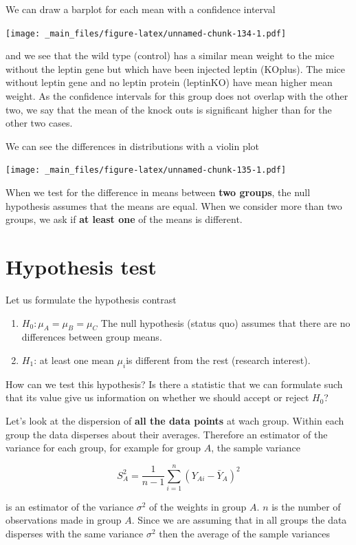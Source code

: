 \documentclass[
]{book}
\begin{document}
We can draw a barplot for each mean with a confidence interval

\texttt{[image: \_main\_files/figure-latex/unnamed-chunk-134-1.pdf]}

and we see that the wild type (control) has a similar mean weight to the mice without the leptin gene but which have been injected leptin (KOplus). The mice without leptin gene and no leptin protein (leptinKO) have mean higher mean weight. As the confidence intervals for this group does not overlap with the other two, we say that the mean of the knock outs is significant higher than for the other two cases.

We can see the differences in distributions with a violin plot

\texttt{[image: \_main\_files/figure-latex/unnamed-chunk-135-1.pdf]}

When we test for the difference in means between \textbf{two groups}, the null hypothesis assumes that the means are equal. When we consider more than two groups, we ask if \textbf{at least one} of the means is different.

\hypertarget{hypothesis-test-2}{%
\section{Hypothesis test}\label{hypothesis-test-2}}

Let us formulate the hypothesis contrast

\begin{enumerate}
\def\labelenumi{\alph{enumi}.}
\item
  \(H_0: \mu_A=\mu_B=\mu_C\) The null hypothesis (status quo) assumes that there are no differences between group means.
\item
  \(H_1\): at least one mean \(\mu_i\)is different from the rest (research interest).
\end{enumerate}

How can we test this hypothesis? Is there a statistic that we can formulate such that its value give us information on whether we should accept or reject \(H_0\)?

Let's look at the dispersion of \textbf{all the data points} at wach group.
Within each group the data disperses about their averages. Therefore an estimator of the variance for each group, for example for group \(A\), the sample variance

\[S_A^2=\frac{1}{n-1} \sum_{i=1}^n (Y_{Ai}-\bar{Y}_{A})^2\]

is an estimator of the variance \(\sigma^2\) of the weights in group \(A\). \(n\) is the number of observations made in group \(A\). Since we are assuming that in all groups the data disperses with the same variance \(\sigma^2\) then the average of the sample variances
\end{document}
